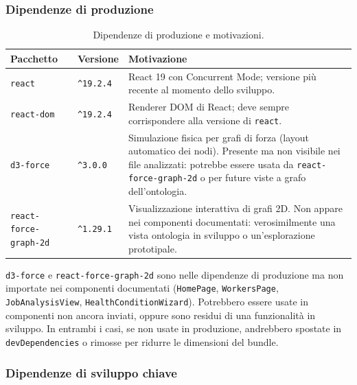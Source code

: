 \documentclass[a4paper,12pt]{article}
\begin{document}
\subsubsection{Dipendenze di produzione}

\begin{table}[H]
\centering\small
\caption{Dipendenze di produzione e motivazioni.}
\begin{tabular}{L{5cm} L{2.5cm} L{5cm}}
\toprule
\textbf{Pacchetto} & \textbf{Versione} & \textbf{Motivazione} \\
\midrule
\texttt{react} & \texttt{\^{}19.2.4} &
  React 19 con Concurrent Mode; versione pi\`{u} recente al momento
  dello sviluppo. \\[3pt]
\texttt{react-dom} & \texttt{\^{}19.2.4} &
  Renderer DOM di React; deve sempre corrispondere alla versione
  di \texttt{react}. \\[3pt]
\texttt{d3-force} & \texttt{\^{}3.0.0} &
  Simulazione fisica per grafi di forza (layout automatico dei nodi).
  Presente ma non visibile nei file analizzati: potrebbe essere
  usata da \texttt{react-force-graph-2d} o per future viste a grafo
  dell'ontologia. \\[3pt]
\texttt{react-force-graph-2d} & \texttt{\^{}1.29.1} &
  Visualizzazione interattiva di grafi 2D. Non appare nei componenti
  documentati: verosimilmente una vista ontologia in sviluppo o
  un'esplorazione prototipale. \\
\bottomrule
\end{tabular}
\end{table}

\begin{warningbox}
\texttt{d3-force} e \texttt{react-force-graph-2d} sono nelle dipendenze
di produzione ma non importate nei componenti documentati
(\texttt{HomePage}, \texttt{WorkersPage}, \texttt{JobAnalysisView},
\texttt{HealthConditionWizard}). Potrebbero essere usate in componenti
non ancora inviati, oppure sono residui di una funzionalit\`{a} in
sviluppo. In entrambi i casi, se non usate in produzione, andrebbero
spostate in \texttt{devDependencies} o rimosse per ridurre le dimensioni
del bundle.
\end{warningbox}

\subsubsection{Dipendenze di sviluppo chiave}
\end{document}
